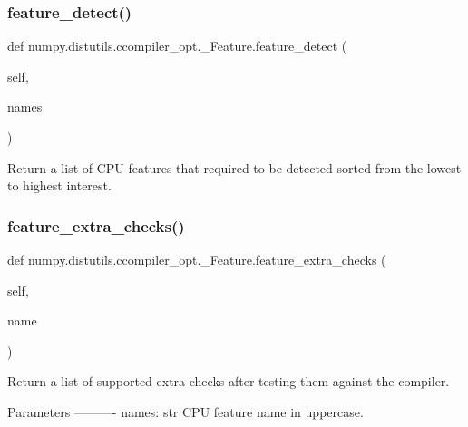 \subsubsection{\texorpdfstring{feature\+\_\+detect()}{feature\_detect()}}
{\footnotesize\ttfamily def numpy.\+distutils.\+ccompiler\+\_\+opt.\+\_\+\+Feature.\+feature\+\_\+detect (\begin{DoxyParamCaption}\item[{}]{self,  }\item[{}]{names }\end{DoxyParamCaption})}

\begin{DoxyVerb}Return a list of CPU features that required to be detected
sorted from the lowest to highest interest.
\end{DoxyVerb}
 \mbox{\label{classnumpy_1_1distutils_1_1ccompiler__opt_1_1__Feature_ae5efa7e50ecf910ffd5fecaf31c56a6e}} 
\subsubsection{\texorpdfstring{feature\+\_\+extra\+\_\+checks()}{feature\_extra\_checks()}}
{\footnotesize\ttfamily def numpy.\+distutils.\+ccompiler\+\_\+opt.\+\_\+\+Feature.\+feature\+\_\+extra\+\_\+checks (\begin{DoxyParamCaption}\item[{}]{self,  }\item[{}]{name }\end{DoxyParamCaption})}

\begin{DoxyVerb}Return a list of supported extra checks after testing them against
the compiler.

Parameters
----------
names: str
    CPU feature name in uppercase.
\end{DoxyVerb}
 \mbox{\label{classnumpy_1_1distutils_1_1ccompiler__opt_1_1__Feature_a36b39b27ce1b0e16274b39d40a105fa4}} 
